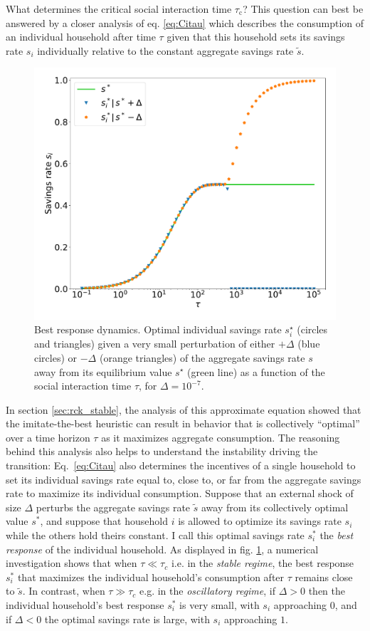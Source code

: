 What determines the critical social interaction time $\tau_\mathrm{c}$?
This question can best be answered by a closer analysis of eq. \eqref{eq:Citau} which describes the consumption of an individual household after time $\tau$ given that this household sets its savings rate $s_i$ individually relative to the constant aggregate savings rate $\tilde{s}$. 
\begin{figure}
  \centering
  \hspace{-1.5cm}\includegraphics[width = .7 \textwidth]{figures/best_response.pdf}
  \caption{Best response dynamics. Optimal individual savings rate $s_i^\star$ (circles and triangles) given a very small perturbation of either $+\Delta$ (blue circles) or $-\Delta$ (orange triangles) of the aggregate savings rate $s$ away from its equilibrium value $s^\star$ (green line) as a function of the social interaction time $\tau$, for $\Delta = 10^{-7}$.}\hspace{.5cm}
  \label{fig:best_response}
\end{figure}

In section \ref{sec:rck_stable}, the analysis of this approximate equation showed that the imitate-the-best heuristic can result in behavior that is collectively ``optimal'' over a time horizon $\tau$ as it maximizes aggregate consumption. 
The reasoning behind this analysis also helps to understand the instability driving the transition: Eq.~\eqref{eq:Citau} also determines the incentives of a single household to set its individual savings rate equal to, close to, or far from the aggregate savings rate to maximize its individual consumption. 
Suppose that an external shock of size $\Delta$ perturbs the aggregate savings rate $\tilde{s}$ away from its collectively optimal value $s^\ast$, and suppose that household $i$ is allowed to optimize its savings rate $s_i$ while the others hold theirs constant. 
I call this optimal savings rate $s^*_i$ the \emph{best response} of the individual household. 
As displayed in fig. \ref{fig:best_response}, a numerical investigation shows that when $\tau \ll \tau_{c}$ i.e. in the \emph{stable regime}, the best response $s^*_i$ that maximizes the individual household's consumption after $\tau$ remains close to $\tilde{s}$. 
In contrast, when  $\tau \gg \tau_{c}$ e.g. in the \emph{oscillatory regime}, if $\Delta > 0$ then the individual household's best response $s^*_i$ is very small, with $s_i$ approaching $0$, and if $\Delta < 0$ the optimal savings rate is large, with $s_i$ approaching $1$. 



